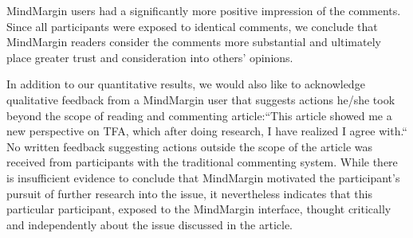 MindMargin users had a significantly more positive impression of the comments. Since all participants were exposed to identical comments, we conclude that MindMargin readers consider the comments more substantial and ultimately place greater trust and consideration into others' opinions.

In addition to our quantitative results, we would also like to acknowledge qualitative feedback from a MindMargin user that suggests actions he/she took beyond the scope of reading and commenting article:``This article showed me a new perspective on TFA, which after doing research, I have realized I agree with.`` No written feedback suggesting actions outside the scope of the article was received from participants with the traditional commenting system. While there is insufficient evidence to conclude that MindMargin motivated the participant's pursuit of further research into the issue, it nevertheless indicates that this particular participant, exposed to the MindMargin interface, thought critically and independently about the issue discussed in the article.